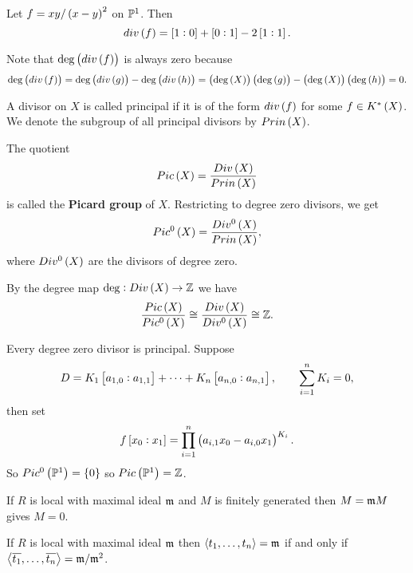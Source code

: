 \begin{example}
Let $ f = xy / \br{x - y}^2 $ on $ \P^1 $. Then
$$ div\br{f} = \sbr{1 : 0} + \sbr{0 : 1} - 2\sbr{1 : 1}. $$
\end{example}

\begin{remark}
Note that $ \deg\br{div\br{f}} $ is always zero because
$$ \deg\br{div\br{f}} = \deg\br{div\br{g}} - \deg\br{div\br{h}} = \br{\deg\br{X}}\br{\deg\br{g}} - \br{\deg\br{X}}\br{\deg\br{h}} = 0. $$
\end{remark}

\begin{definition}
A divisor on $ X $ is called principal if it is of the form $ div\br{f} $ for some $ f \in K^*\br{X} $. We denote the subgroup of all principal divisors by $ Prin\br{X} $.
\end{definition}

\begin{definition}
The quotient
$$ Pic\br{X} = \dfrac{Div\br{X}}{Prin\br{X}} $$
is called the \textbf{Picard group} of $ X $. Restricting to degree zero divisors, we get
$$ Pic^0\br{X} = \dfrac{Div^0\br{X}}{Prin\br{X}}, $$
where $ Div^0\br{X} $ are the divisors of degree zero.
\end{definition}

By the degree map $ \deg : Div\br{X} \to \Z $ we have
$$ \dfrac{Pic\br{X}}{Pic^0\br{X}} \cong \dfrac{Div\br{X}}{Div^0\br{X}} \cong \Z. $$

\pagebreak

\begin{example}
Every degree zero divisor is principal. Suppose
$$ D = K_1\sbr{a_{1, 0} : a_{1, 1}} + \dots + K_n\sbr{a_{n, 0} : a_{n, 1}}, \qquad \sum_{i = 1}^n K_i = 0, $$
then set
$$ f\sbr{x_0 : x_1} = \prod_{i = 1}^n \br{a_{i, 1}x_0 - a_{i, 0}x_1}^{K_i}. $$
So $ Pic^0\br{\P^1} = \cbr{0} $ so $ Pic\br{\P^1} = \Z $.
\end{example}


\begin{lemma}
If $ R $ is local with maximal ideal $ \mm $ and $ M $ is finitely generated then $ M = \mm M $ gives $ M = 0 $.
\end{lemma}

\begin{corollary}
If $ R $ is local with maximal ideal $ \mm $ then $ \abr{t_1, \dots, t_n} = \mm $ if and only if $ \abr{\overline{t_1}, \dots, \overline{t_n}} = \mm / \mm^2 $.
\end{corollary}

